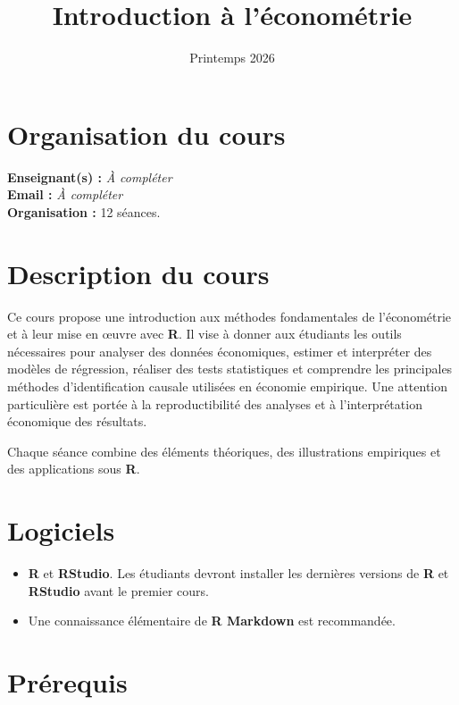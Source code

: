 \documentclass[
  11pt,
]{article}
\title{Introduction à l'économétrie}
\author{}
\date{\vspace{-2.5em}Printemps 2026}
\providecommand{\tightlist}{%
  \setlength{\itemsep}{0pt}\setlength{\parskip}{0pt}}
\begin{document}
\maketitle

\section{Organisation du cours}\label{organisation-du-cours}

\textbf{Enseignant(s) :} \emph{À compléter}\\
\textbf{Email :} \emph{À compléter}\\
\textbf{Organisation :} 12 séances.

\section{Description du cours}\label{description-du-cours}

Ce cours propose une introduction aux méthodes fondamentales de
l'économétrie et à leur mise en œuvre avec \textbf{R}. Il vise à donner
aux étudiants les outils nécessaires pour analyser des données
économiques, estimer et interpréter des modèles de régression, réaliser
des tests statistiques et comprendre les principales méthodes
d'identification causale utilisées en économie empirique. Une attention
particulière est portée à la reproductibilité des analyses et à
l'interprétation économique des résultats.

Chaque séance combine des éléments théoriques, des illustrations
empiriques et des applications sous \textbf{R}.

\section{Logiciels}\label{logiciels}

\begin{itemize}
\tightlist
\item
  \textbf{R} et \textbf{RStudio}. Les étudiants devront installer les
  dernières versions de \textbf{R} et \textbf{RStudio} avant le premier
  cours.
\item
  Une connaissance élémentaire de \textbf{R Markdown} est recommandée.
\end{itemize}

\section{Prérequis}\label{pruxe9requis}
\end{document}
